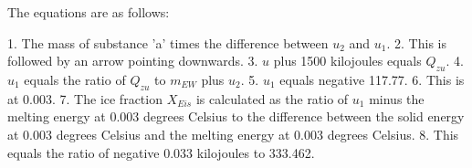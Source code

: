 The equations are as follows:

1. The mass of substance 'a' times the difference between \( u_2 \) and \( u_1 \).
2. This is followed by an arrow pointing downwards.
3. \( u \) plus 1500 kilojoules equals \( Q_{zu} \).
4. \( u_1 \) equals the ratio of \( Q_{zu} \) to \( m_{EW} \) plus \( u_2 \).
5. \( u_1 \) equals negative 117.77.
6. This is at 0.003.
7. The ice fraction \( X_{Eis} \) is calculated as the ratio of \( u_1 \) minus the melting energy at 0.003 degrees Celsius to the difference between the solid energy at 0.003 degrees Celsius and the melting energy at 0.003 degrees Celsius.
8. This equals the ratio of negative 0.033 kilojoules to 333.462.